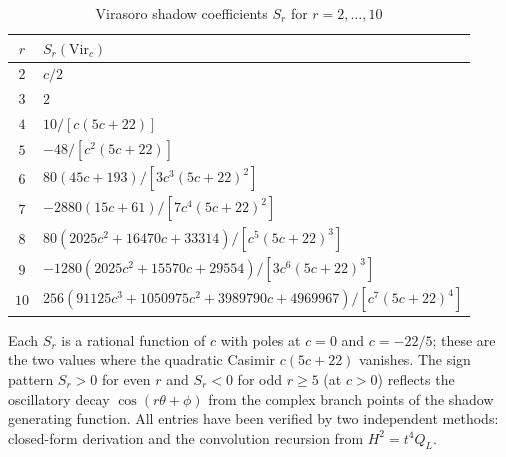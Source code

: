 \begin{table}[ht]
\centering
\caption{Virasoro shadow coefficients $S_r$ for $r = 2, \dotsc, 10$}
\label{tab:virasoro-tower}
\renewcommand{\arraystretch}{1.35}
{\small
\begin{tabular}{cl}
\toprule
$r$ & $S_r(\mathrm{Vir}_c)$ \\
\midrule
$2$ & $c/2$ \\
$3$ & $2$ \\
$4$ & $10/[c(5c+22)]$ \\
$5$ & $-48/[c^2(5c+22)]$ \\
$6$ & $80(45c+193)/[3c^3(5c+22)^2]$ \\
$7$ & $-2880(15c+61)/[7c^4(5c+22)^2]$ \\
$8$ & $80(2025c^2+16470c+33314)/[c^5(5c+22)^3]$ \\
$9$ & $-1280(2025c^2+15570c+29554)/[3c^6(5c+22)^3]$ \\
$10$ & $256(91125c^3+1050975c^2+3989790c+4969967)/[c^7(5c+22)^4]$ \\
\bottomrule
\end{tabular}
}
\end{table}

\noindent
Each $S_r$ is a rational function of $c$ with poles at $c = 0$ and
$c = -22/5$; these are the two values where the quadratic Casimir
$c(5c+22)$ vanishes. The sign pattern
$S_r > 0$ for even $r$ and $S_r < 0$ for odd $r \geq 5$
(at $c > 0$) reflects the oscillatory decay $\cos(r\theta + \phi)$
from the complex branch points of the shadow generating function.
All entries have been verified by two independent methods: closed-form
derivation and the convolution recursion from $H^2 = t^4 Q_L$.
